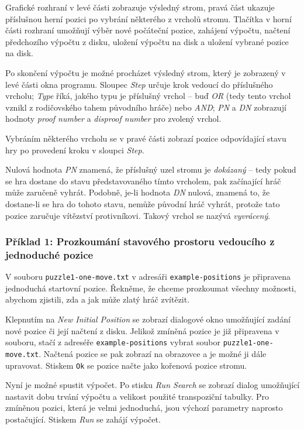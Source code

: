 \documentclass{article}
\begin{document}
Grafické rozhraní v levé části zobrazuje výsledný strom, pravá část ukazuje příslušnou herní pozici po vybrání některého
z vrcholů stromu. Tlačítka v horní části rozhraní umožňují výběr nové počáteční pozice, zahájení výpočtu, načtení
předchozího výpočtu z disku, uložení výpočtu na disk a uložení vybrané pozice na disk.

Po skončení výpočtu je možné procházet výsledný strom, který je zobrazený v levé části okna programu. Sloupec
\emph{Step} určuje krok vedoucí do příslušného vrcholu; \emph{Type} říká, jakého typu je příslušný vrchol -- buď
\emph{OR} (tedy tento vrchol vznikl z rodičovského tahem původního hráče) nebo \emph{AND}; \emph{PN} a \emph{DN}
zobrazují hodnoty \emph{proof number} a \emph{disproof number} pro zvolený vrchol.

Vybráním některého vrcholu se v pravé části zobrazí pozice odpovídající stavu hry po provedení kroku v sloupci
\emph{Step}.

Nulová hodnota \emph{PN} znamená, že příslušný uzel stromu je \emph{dokázaný} -- tedy pokud se hra dostane do stavu
představovaného tímto vrcholem, pak začínající hráč může zaručeně vyhrát. Podobně, je-li hodnota \emph{DN} nulová,
znamená to, že dostane-li se hra do tohoto stavu, nemůže původní hráč vyhrát, protože tato pozice zaručuje vítězství
protivníkovi. Takový vrchol se nazývá \emph{vyvrácený}.

\subsubsection{Příklad 1: Prozkoumání stavového prostoru vedoucího z jednoduché pozice}
V souboru \texttt{puzzle1-one-move.txt} v adresáři \texttt{example-positions} je připravena jednoduchá startovní pozice.
Řekněme, že chceme prozkoumat všechny možnosti, abychom zjistili, zda a jak může zlatý hráč zvítězit.

Klepnutím na \emph{New Initial Position} se zobrazí dialogové okno umožňující zadání nové pozice či její načtení z
disku. Jelikož zmíněná pozice je již připravena v souboru, stačí z adreséře \texttt{example-positions} vybrat soubor
\texttt{puzzle1-{}one-{}move.txt}. Načtená pozice se pak zobrazí na obrazovce a je možné ji dále upravovat. Stiskem
\texttt{Ok} se pozice načte jako kořenová pozice stromu.

Nyní je možné spustit výpočet. Po stisku \emph{Run Search} se zobrazí dialog umožňující nastavit dobu trvání výpočtu
a velikost použité transpoziční tabulky. Pro zmíněnou pozici, která je velmi jednoduchá, jsou výchozí parametry naprosto
postačující. Stiskem \emph{Run} se zahájí výpočet.
\end{document}
